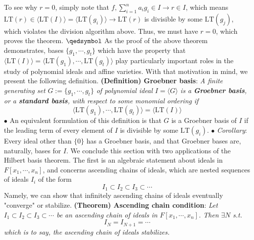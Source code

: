 \documentclass{article}
\begin{document}
\newline
\indent To see why $ r = 0 $, simply note that $ f, \sum_{i = 1}^n a_i g_i \in I \rightarrow r \in I $, which means $ \text{LT}(r) \in \langle \text{LT}(I) \rangle = \langle \text{LT}(g_i) \rangle \rightarrow \text{LT}(r) $ is divisible by some $ \text{LT}(g_j) $, which violates the division algorithm above. Thus, we must have $ r = 0 $, which proves the theorem. $ \qedsymbol $
\newline \newline
As the proof of the above theorem demonstrates, bases $ \{ g_1, \cdots, g_t \} $ which have the property that $ \langle \text{LT}(I) \rangle = \langle \text{LT}(g_1), \cdots, \text{LT}(g_t) \rangle $ play particularly important roles in the study of polynomial ideals and affine varieties. With that motivation in mind, we present the following definition.
\newline \newline
\textbf{(Definition) Groebner basis}: \textit{A finite generating set $ G := \{ g_1, \cdots, g_t \} $ of polynomial ideal $ I = \langle G \rangle $ is a \textbf{Groebner basis}, or a \textbf{standard basis}, with respect to some monomial ordering if}
$$ \langle \text{LT}(g_1), \cdots, \text{LT}(g_t) \rangle = \langle \text{LT}(I) \rangle $$
\indent $ \bullet $ An equivalent formulation of this definition is that $ G $ is a Groebner basis of $ I $ if the leading term of every element of $ I $ is divisible by some $ \text{LT}(g_i) $.
\newline
\indent $ \bullet $ \textit{Corollary}: Every ideal other than $ \{ 0 \} $ has a Groebner basis, and that Groebner bases are, naturally, bases for $ I $.
\newline \newline
We conclude this section with two applications of the Hilbert basis theorem. The first is an algebraic statement about ideals in $ F[x_1, \cdots, x_n] $, and concerns ascending chains of ideals, which are nested sequences of ideals $ I_i $ of the form
$$ I_1 \subset I_2 \subset I_3 \subset \cdots $$
Namely, we can show that infinitely ascending chains of ideals eventually "converge" or stabilize.
\newline \newline
\textbf{(Theorem) Ascending chain condition}: \textit{Let $ I_1 \subset I_2 \subset I_3 \subset \cdots $ be an ascending chain of ideals in $ F[x_1, \cdots, x_n] $. Then $ \exists N $ s.t.}
$$ I_N = I_{N + 1} = \cdots $$
\indent \textit{which is to say, the ascending chain of ideals stabilizes.}
\end{document}

